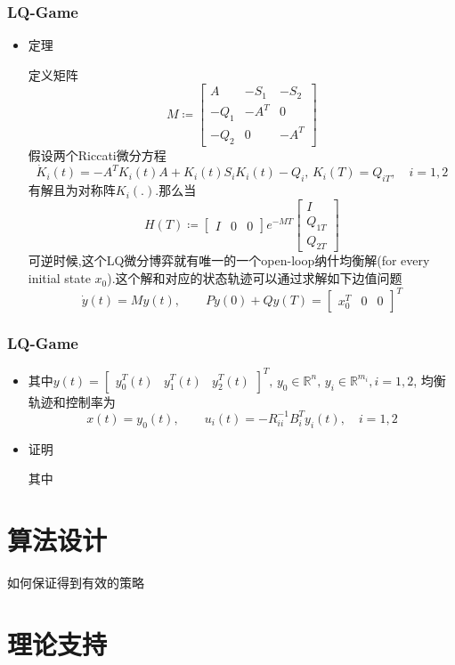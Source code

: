 \documentclass[UTF8, aspectratio=169, 9pt]{ctexbeamer}
\begin{document}
\begin{frame}
\frametitle{LQ-Game}
\begin{itemize}
\item 定理


  定义矩阵
  $$
  M \coloneqq \begin{bmatrix}
  A &  -S_1 & -S_2 \\
 -Q_1 & -A^T & 0\\
 -Q_2 & 0 & -A^T
\end{bmatrix}
  $$
  假设两个Riccati微分方程
  $$
  \dot{K}_i(t) = - A^T K_i(t) A + K_i (t) S_i K_i(t) - Q_i, \, K_i(T) = Q_{iT}, \quad i=1,2
  $$
  有解且为对称阵$K_i(.)$.那么当
  $$
  H(T) \coloneqq \begin{bmatrix} I & 0 & 0 \end{bmatrix} e^{- M T} \begin{bmatrix} I \\ Q_{1T} \\ Q_{2T} \end{bmatrix}
  $$
  可逆时候,这个LQ微分博弈就有唯一的一个open-loop纳什均衡解(for every initial state $x_0$).这个解和对应的状态轨迹可以通过求解如下边值问题
  $$
  \dot{y}(t) = M y(t), \qquad P y(0) + Q y(T) = \begin{bmatrix} x^T_0 & 0 & 0 \end{bmatrix}^T
  $$

\end{itemize}
\end{frame}

\begin{frame}
\frametitle{LQ-Game}
\begin{itemize}
\item
  其中$y(t) = \begin{bmatrix} y^T_0(t) & y^T_1(t) & y^T_2(t) \end{bmatrix}^T, \, y_0 \in \mathbb{R}^n, \, y_i \in \mathbb{R}^{m_i}, i=1,2$, 均衡轨迹和控制率为
  $$
  x(t) = y_0(t), \qquad u_i(t) = - R^{-1}_{ii} B^T_i y_i(t), \quad i=1,2
  $$

  \item 证明
  
  其中
\end{itemize}
\end{frame}

\section{算法设计}
\begin{frame}

  如何保证得到有效的策略
\end{frame}




\section{理论支持}
\begin{frame}

\end{frame}
\end{document}
